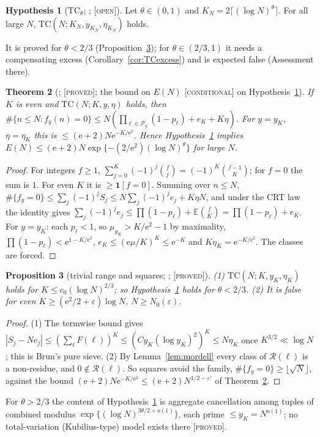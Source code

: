 \documentclass[10pt,reqno]{amsart}
\newtheorem{theorem}{Theorem}[section]
\newtheorem{proposition}[theorem]{Proposition}
\theoremstyle{definition}
\newtheorem{hypothesis}[theorem]{Hypothesis}
\theoremstyle{remark}
\newcommand{\cP}{\mathcal P}
\newcommand{\cR}{\mathscr R}
\newcommand{\E}{\mathbb E}
\newcommand{\ind}{\mathbf 1}
\newcommand{\e}{\mathrm e}
\newcommand{\lab}[1]{\textup{[\textsc{#1}]}}
\begin{document}
\begin{hypothesis}[$\mathrm{TC}_\theta$; {\cite[\S2]{TU}}; \lab{open}]\label{hyp:TC}
Let $\theta\in(0,1)$ and $K_N=2\lceil(\log N)^\theta\rceil$.  For all large $N$,
$\mathrm{TC}(N;K_N,y_{K_N},\eta_{K_N})$ holds.
\end{hypothesis}
It is proved for $\theta<2/3$ (Proposition~\ref{prop:TCrange}); for
$\theta\in(2/3,1)$ it needs a compensating excess
(Corollary~\ref{cor:TCexcess}) and is expected false (Assessment there).

\begin{theorem}[{\cite[Thm~2.1, Cors~2.2, 2.3]{TU}}; \lab{proved}; the bound on $E(N)$ \lab{conditional} on Hypothesis~\ref{hyp:TC}]\label{thm:TCbrun}
If $K$ is even and $\mathrm{TC}(N;K,y,\eta)$ holds, then
$\#\{n\leq N:f_y(n)=0\}\leq N(\prod_{\ell\in\cP_y}(1-p_\ell)+e_K+K\eta)$.  For $y=y_K$,
$\eta=\eta_K$ this is $\leq(\e+2)N\e^{-K/\e^2}$.  Hence Hypothesis~\ref{hyp:TC}
implies $E(N)\leq(\e+2)N\exp\{-(2/\e^2)(\log N)^\theta\}$ for large $N$.
\end{theorem}
\begin{proof}
For integers $f\geq1$, $\sum_{j=0}^K(-1)^j\binom fj=(-1)^K\binom{f-1}K$; for $f=0$ the
sum is $1$.  For even $K$ it is $\geq\ind[f=0]$.  Summing over $n\leq N$,
$\#\{f_y=0\}\leq\sum_j(-1)^jS_j\leq N\sum_j(-1)^je_j+K\eta N$, and under the CRT law
the identity gives $\sum_j(-1)^je_j\leq\prod(1-p_\ell)+\E\binom{f}{K}=\prod(1-p_\ell)+e_K$.
For $y=y_K$: each $p_\ell<1$, so $\mu_{y_K}>K/\e^2-1$ by maximality, $\prod(1-p_\ell)<\e^{1-K/\e^2}$,
$e_K\leq(\e\mu/K)^K\leq\e^{-K}$ and $K\eta_K=\e^{-K/\e^2}$.  The classes are forced.
\end{proof}

\begin{proposition}[trivial range and squares; {\cite[Props~2.4, 4.2]{TU}}; \lab{proved}]\label{prop:TCrange}
(1) $\mathrm{TC}(N;K,y_K,\eta_K)$ holds for $K\leq c_0(\log N)^{2/3}$; so
Hypothesis~\ref{hyp:TC} holds for $\theta<2/3$.  (2) It is false for even
$K\geq(\e^2/2+\varepsilon)\log N$, $N\geq N_0(\varepsilon)$.
\end{proposition}
\begin{proof}
(1) The termwise bound gives
$|S_j-Ne_j|\leq(\sum_\ell F(\ell))^K\leq(Cy_K(\log y_K)^2)^K\leq N\eta_K$ once
$K^{3/2}\ll\log N$; this is Brun's pure sieve.  (2) By
Lemma~\ref{lem:mordell} every class of $\cR(\ell)$ is a non-residue, and
$0\notin\cR(\ell)$.  So squares avoid the family, $\#\{f_y=0\}\geq\lfloor\sqrt N\rfloor$,
against the bound $(\e+2)N\e^{-K/\e^2}\leq(\e+2)N^{1/2-\varepsilon'}$ of
Theorem~\ref{thm:TCbrun}.
\end{proof}
For $\theta>2/3$ the content of Hypothesis~\ref{hyp:TC} is aggregate
cancellation among tuples of combined modulus
$\exp\{(\log N)^{3\theta/2+o(1)}\}$, each prime $\leq y_K=N^{o(1)}$; no total-variation
(Kubilius-type) model exists there \cite[Prop.~4.1]{TU} \lab{proved}.
\end{document}
